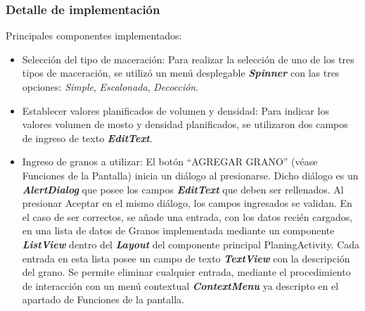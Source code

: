             \subsubsection{Detalle de implementación}
                \par Principales componentes implementados:
                \begin{itemize}
                    \item Selección del tipo de maceración: Para realizar la selección de uno de los tres tipos de maceración, se utilizó un menú desplegable \textbf{\textit{\gls{Spinner}}} con las tres opciones: \textit{Simple}, \textit{Escalonada}, \textit{Decocción}. 
                    
                    \item Establecer valores planificados de volumen y densidad: Para indicar los valores volumen de mosto y densidad planificados, se utilizaron dos campos de ingreso de texto \textbf{\textit{\gls{EditText}}}.
                    
                    \item Ingreso de granos a utilizar: El botón ``AGREGAR GRANO'' (véase Funciones de la Pantalla) inicia un diálogo al presionarse. Dicho diálogo es un \textbf{\textit{\gls{AlertDialog}}} que posee los campos \textbf{\textit{\gls{EditText}}} que deben ser rellenados. 
                    Al presionar Aceptar en el mismo diálogo, los campos ingresados se validan. En el caso de ser correctos, se añade una entrada, con los datos recién cargados, en una lista de datos de Granos implementada mediante un componente \textbf{\textit{\gls{ListView}}} dentro del \textbf{\textit{\gls{Layout}}} del componente principal PlaningActivity. Cada entrada en esta lista posee un campo de texto \textbf{\textit{\gls{TextView}}} con la descripción del grano. 
                    Se permite eliminar cualquier entrada, mediante el procedimiento de interacción con un menú contextual \textbf{\textit{\gls{ContextMenu}}} ya descripto en el apartado de Funciones de la pantalla.
                    

\end{itemize}
